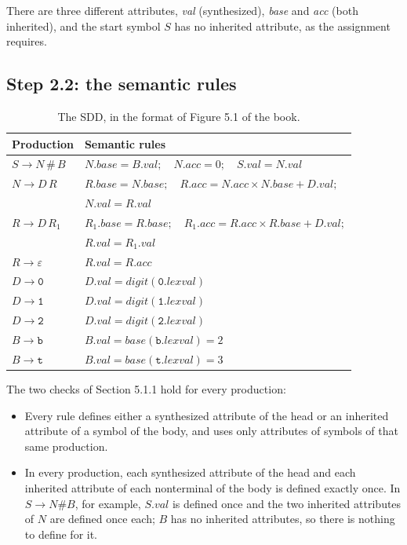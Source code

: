 \documentclass[11pt]{article}
\begin{document}
There are three different attributes, \textit{val} (synthesized), \textit{base} and
\textit{acc} (both inherited), and the start symbol $S$ has no inherited attribute, as
the assignment requires.

\subsection{Step 2.2: the semantic rules}

\begin{table}[h]
\centering
\small
\begin{tabular}{@{}ll@{}}
\toprule
\textbf{Production} & \textbf{Semantic rules} \\
\midrule
$S \rightarrow N\,\texttt{\#}\,B$ & $N.base = B.val;\quad N.acc = 0;\quad S.val = N.val$ \\
\addlinespace
$N \rightarrow D\,R$ & $R.base = N.base;\quad R.acc = N.acc \times N.base + D.val;$ \\
                     & $N.val = R.val$ \\
\addlinespace
$R \rightarrow D\,R_1$ & $R_1.base = R.base;\quad R_1.acc = R.acc \times R.base + D.val;$ \\
                       & $R.val = R_1.val$ \\
\addlinespace
$R \rightarrow \varepsilon$ & $R.val = R.acc$ \\
\addlinespace
$D \rightarrow \texttt{0}$ & $D.val = \textit{digit}(\texttt{0}.lexval)$ \\
$D \rightarrow \texttt{1}$ & $D.val = \textit{digit}(\texttt{1}.lexval)$ \\
$D \rightarrow \texttt{2}$ & $D.val = \textit{digit}(\texttt{2}.lexval)$ \\
\addlinespace
$B \rightarrow \texttt{b}$ & $B.val = \textit{base}(\texttt{b}.lexval) = 2$ \\
$B \rightarrow \texttt{t}$ & $B.val = \textit{base}(\texttt{t}.lexval) = 3$ \\
\bottomrule
\end{tabular}
\caption{The SDD, in the format of Figure 5.1 of the book.}
\label{tab:sdd}
\end{table}

The two checks of Section 5.1.1 hold for every production:

\begin{itemize}
  \item Every rule defines either a synthesized attribute of the head or an inherited
        attribute of a symbol of the body, and uses only attributes of symbols of that
        same production.
  \item In every production, each synthesized attribute of the head and each inherited
        attribute of each nonterminal of the body is defined exactly once. In
        $S \rightarrow N\texttt{\#}B$, for example, $S.val$ is defined once and the two
        inherited attributes of $N$ are defined once each; $B$ has no inherited
        attributes, so there is nothing to define for it.
\end{itemize}
\end{document}
